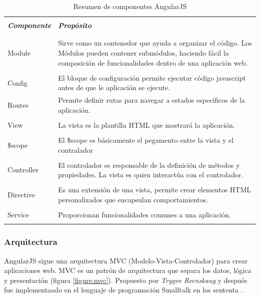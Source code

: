 			\begin{table}[H]
				\begin{tabular}{|p{2.75cm}|p{14cm}|} \hline
					 & \\
					\textit{\bfseries Componente} & \textit{\bfseries Propósito} \\
					 & \\ \hline
					 
					 & \\
					Module & Sirve como un contenedor que ayuda a organizar el
					código. Los Módulos pueden contener submódulos, haciendo fácil la
					composición de funcionalidades dentro de una aplicación web.\\
					 & \\
					 
					Config & El bloque de configuración permite ejecutar código javascript
					antes de que le aplicación se ejecute.\\
					Routes & Permite definir rutas para navegar a estados específicos de la
					aplicación.\\
					& \\
					
					View & La vista es la plantilla HTML que mostrará la aplicación.\\
					& \\
					
					\$scope & El \$scope es básicamente el pegamento entre la vista y el
					contralador\\
					& \\
					
					Controller & El controlador es responsable de la definición de métodos y
					propiedades. La vista es quien interactúa con el controlador.\\
					& \\
					
					Directive & Es una extensión de una vista, permite crear
					elementos HTML personalizados que encapsulan comportamientos.\\
					& \\
					Service & Proporcionan funcionalidades comunes a una aplicación.\\
					& \\ \hline
				\end{tabular}
				\caption{Resumen de componentes AngularJS}
			\end{table}
			
		\subsubsection{Arquitectura}
			AngularJS sigue una arquitectura MVC (Modelo-Vista-Controlador) para crear
			aplicaciones web. MVC es un patrón de
			arquitectura que separa los datos, lógica y
			presentación (figura \ref{figure:mvc}). Propuesto por
			\textit{Trygve Reenskaug} y después fue implementaado en el lenguaje de
			programación Smalltalk en los sententa \cite{scott1spa}.
			
